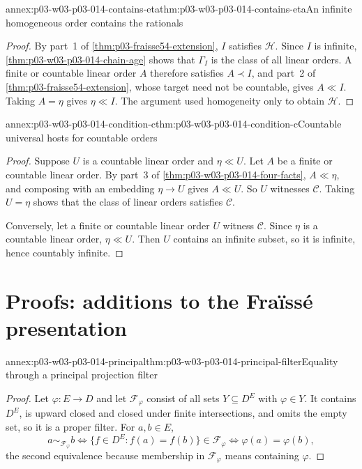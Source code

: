 \begin{annexitem}{annex:p03-w03-p03-014-contains-eta}{thm:p03-w03-p03-014-contains-eta}{An infinite homogeneous order contains the rationals}
\begin{proof}
By part~1 of \cref{thm:p03-fraisse54-extension}, \(I\) satisfies
\(\mathcal H\). Since \(I\) is infinite,
\cref{thm:p03-w03-p03-014-chain-age} shows that \(\Gamma_I\) is the
class of all linear orders. A finite or countable linear order \(A\)
therefore satisfies \(A\prec I\), and part~2 of
\cref{thm:p03-fraisse54-extension}, whose target need not be countable,
gives \(A\ll I\). Taking \(A=\eta\) gives \(\eta\ll I\).
The argument used homogeneity only to obtain \(\mathcal H\).
\end{proof}
\end{annexitem}

\begin{annexitem}{annex:p03-w03-p03-014-condition-c}{thm:p03-w03-p03-014-condition-c}{Countable universal hosts for countable orders}
\begin{proof}
Suppose \(U\) is a countable linear order and \(\eta\ll U\). Let \(A\)
be a finite or countable linear order. By part~3 of
\cref{thm:p03-w03-p03-014-four-facts}, \(A\ll\eta\), and composing
with an embedding \(\eta\to U\) gives \(A\ll U\). So \(U\) witnesses
\(\mathcal C\). Taking \(U=\eta\) shows that the class of linear
orders satisfies \(\mathcal C\).

Conversely, let a finite or countable linear order \(U\) witness
\(\mathcal C\). Since \(\eta\) is a countable linear order,
\(\eta\ll U\). Then \(U\) contains an infinite subset, so it is
infinite, hence countably infinite.
\end{proof}
\end{annexitem}

\section{Proofs: additions to the Fra\"iss\'e presentation}
\label{sec:annex-p03-w03-p03-014-fraisse}

\begin{annexitem}{annex:p03-w03-p03-014-principal}{thm:p03-w03-p03-014-principal-filter}{Equality through a principal projection filter}
\begin{proof}
Let \(\varphi:E\to D\) and let \(\mathcal F_\varphi\) consist of all
sets \(Y\subseteq D^E\) with \(\varphi\in Y\). It contains \(D^E\),
is upward closed and closed under finite intersections, and omits the
empty set, so it is a proper filter. For \(a,b\in E\),
\[
 a\sim_{\mathcal F_\varphi}b
 \iff \{f\in D^E:f(a)=f(b)\}\in\mathcal F_\varphi
 \iff \varphi(a)=\varphi(b),
\]
the second equivalence because membership in \(\mathcal F_\varphi\)
means containing \(\varphi\).
\end{proof}
\end{annexitem}


